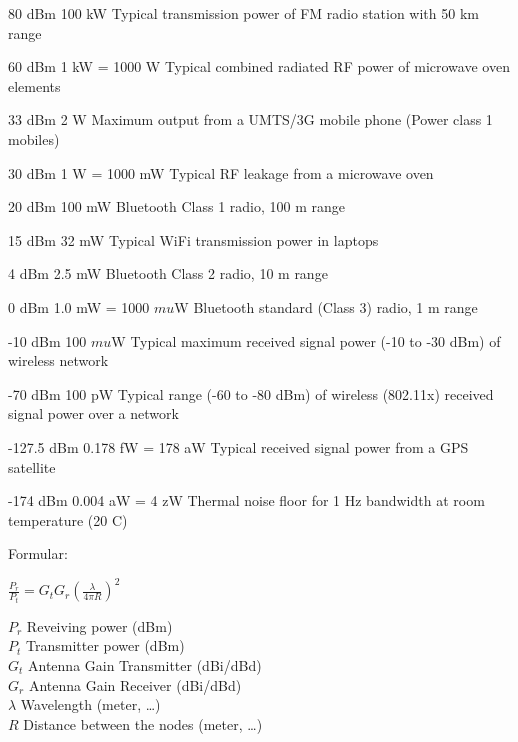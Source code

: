 \documentclass[9pt]{article}
\begin{document}
\begin{slide}
\bi
	\item 80 dBm	100 kW	Typical transmission power of FM radio station with 50 km range
	\item 60 dBm	1 kW = 1000 W	Typical combined radiated RF power of microwave oven elements
	\item 33 dBm	2 W		Maximum output from a UMTS/3G mobile phone (Power class 1 mobiles)
	\item 30 dBm	1 W = 1000 mW	Typical RF leakage from a microwave oven
	\item 20 dBm	100 mW	Bluetooth Class 1 radio, 100 m range
	\item 15 dBm	32 mW	Typical WiFi transmission power in laptops
	\item 4 dBm		2.5 mW	Bluetooth Class 2 radio, 10 m range
	\item 0 dBm		1.0 mW = 1000 $mu$W	Bluetooth standard (Class 3) radio, 1 m range
	\item -10 dBm	100 $mu$W	Typical maximum received signal power (-10 to -30 dBm) of wireless network
	\item -70 dBm	100 pW	Typical range (-60 to -80 dBm) of wireless (802.11x) received signal power over a network
	\item -127.5 dBm	0.178 fW = 178 aW	Typical received signal power from a GPS satellite
	\item -174 dBm	0.004 aW = 4 zW		Thermal noise floor for 1 Hz bandwidth at room temperature (20 C)
\ei
\end{slide}

\begin{slide}
\slidetitle{}{}
\bi
	\item 
\ei
\end{slide}

\begin{slide}
\bi
	\item Formular:\\\vspace{1cm}
	\begin{large}
	\begin{math}
	\frac{P_r}{P_t} = G_t G_r (\frac{\lambda}{4 \pi R} )^2
	\end{math}\\\vspace{1cm}
	\end{large}
	\begin{small}
	$P_r$ Reveiving power (dBm)\\
	$P_t$ Transmitter power (dBm)\\
	$G_t$ Antenna Gain Transmitter (dBi/dBd)\\
	$G_r$ Antenna Gain Receiver (dBi/dBd)\\
	$\lambda$ Wavelength (meter, \dots)\\
	$R$ Distance between the nodes (meter, \dots)\\
	\end{small}
\ei
\end{slide}
\end{document}

